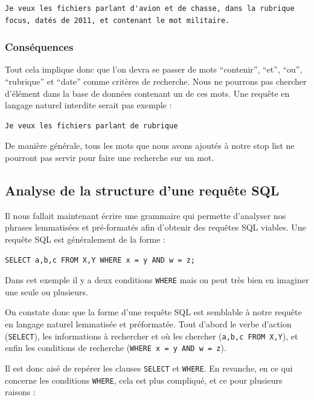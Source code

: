 \begin{lstlisting}
Je veux les fichiers parlant d'avion et de chasse, dans la rubrique focus, datés de 2011, et contenant le mot militaire.
\end{lstlisting}

\subsubsection{Conséquences}

Tout cela implique donc que l'on devra se passer de mots ``contenir'', ``et'', ``ou'', ``rubrique'' et ``date'' comme critères de recherche. Nous ne pourrons pas chercher d'élément dans la base de données contenant un de ces mots. Une requête en langage naturel interdite serait pas exemple :

\begin{lstlisting}
Je veux les fichiers parlant de rubrique
\end{lstlisting}

De manière générale, tous les mots que nous avons ajoutés à notre stop list ne pourront pas servir pour faire une recherche sur un mot.

\subsection{Analyse de la structure d'une requête SQL}

Il nous fallait maintenant écrire une grammaire qui permette d'analyser nos phrases lemmatisées et pré-formatés afin d'obtenir des requêtes SQL viables. Une requête SQL est généralement de la forme :

\sql
\begin{lstlisting}
SELECT a,b,c FROM X,Y WHERE x = y AND w = z;
\end{lstlisting}
Dans cet exemple il y a deux conditions \lstinline{WHERE} mais on peut très bien en imaginer une seule ou plusieurs.

\medskip

On constate donc que la forme d'une requête SQL est semblable à notre requête en langage naturel lemmatisée et préformatée. Tout d'abord le verbe d'action (\lstinline{SELECT}), les informations à rechercher et où les chercher (\lstinline{a,b,c FROM X,Y}), et enfin les conditions de recherche (\lstinline{WHERE x = y AND w = z}).

\medskip

Il est donc aisé de repérer les clauses \lstinline{SELECT} et \lstinline{WHERE}. En revanche, en ce qui concerne les conditions \lstinline{WHERE}, cela est plus compliqué, et ce pour plusieurs raisons :

